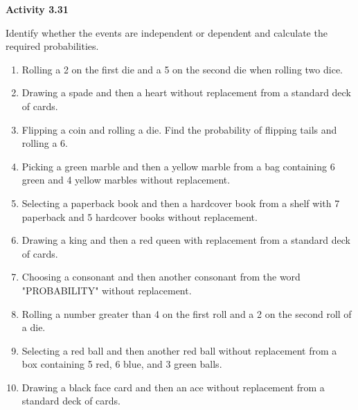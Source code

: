 \vspace{0.3ex}
\noindent\textbf{Activity 3.31}

\vspace{0.2ex}

Identify whether the events are independent or dependent and calculate the required probabilities.

\begin{enumerate}[label=\color{blue}\arabic*.]
    \item Rolling a 2 on the first die and a 5 on the second die when rolling two dice.
    \item Drawing a spade and then a heart without replacement from a standard deck of cards.
    \item Flipping a coin and rolling a die. Find the probability of flipping tails and rolling a 6.
    \item Picking a green marble and then a yellow marble from a bag containing 6 green and 4 yellow marbles without replacement.
    \item Selecting a paperback book and then a hardcover book from a shelf with 7 paperback and 5 hardcover books without replacement.
    \item Drawing a king and then a red queen with replacement from a standard deck of cards.
    \item Choosing a consonant and then another consonant from the word "PROBABILITY" without replacement.
    \item Rolling a number greater than 4 on the first roll and a 2 on the second roll of a die.
    \item Selecting a red ball and then another red ball without replacement from a box containing 5 red, 6 blue, and 3 green balls.
    \item Drawing a black face card and then an ace without replacement from a standard deck of cards.
    \end{enumerate}
